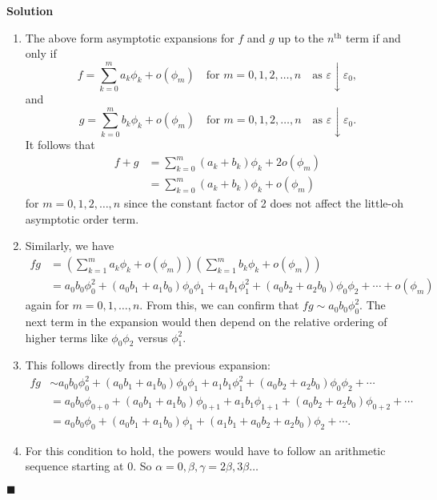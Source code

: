 \documentclass[11pt]{article}
\theoremstyle{problemstyle}
\newenvironment{solution}
  {\noindent\textbf{Solution}\quad}
  {\hfill$\blacksquare$\par\vspace{1em}}
\begin{document}
\begin{solution}
  \begin{enumerate}
    \item The above form asymptotic expansions for $f$ and $g$ up to the $n^\text{th}$ term if and
      only if
      \[
        f = \sum_{k=0}^{m} a_k \phi_k + o(\phi_m) \quad \text{for } m = 0, 1, 2, \dots, n \quad
        \text{as } \varepsilon \downarrow \varepsilon_0,
      \]
      and
      \[
        g = \sum_{k=0}^{m} b_k \phi_k + o(\phi_m) \quad \text{for } m = 0, 1, 2, \dots, n \quad
        \text{as } \varepsilon \downarrow \varepsilon_0.
      \]
      It follows that
      \begin{align*}
        f + g & = \sum_{k=0}^{m} (a_k + b_k) \phi_k + 2o(\phi_m) \\
              & = \sum_{k=0}^{m} (a_k + b_k) \phi_k + o(\phi_m)
      \end{align*}
      for $m = 0, 1, 2 ,\dots, n$ since the constant factor of 2 does not affect the little-oh
      asymptotic order term.
    \item Similarly, we have
      \begin{align*}
        fg & = \left( \sum_{k=1}^{m} a_k \phi_k + o(\phi_m) \right) \left( \sum_{k=1}^{m} b_k \phi_k
                + o(\phi_m) \right) \\
           & = a_0b_0\phi_0^2 + (a_0b_1 + a_1b_0)\phi_0\phi_1 + a_1b_1\phi_1^2 + (a_0b_2 +
                a_2b_0)\phi_0\phi_2 + \cdots + o(\phi_m)
      \end{align*}
      again for $m = 0, 1, \dots, n$. From this, we can confirm that $fg \sim a_0b_0\phi_0^2$. The
      next term in the expansion would then depend on the relative ordering of higher terms like
      $\phi_0\phi_2$ versus $\phi_1^2$.
    \item This follows directly from the previous expansion:
      \begin{align*}
        fg & \sim a_0b_0\phi_0^2 + (a_0b_1 + a_1b_0)\phi_0\phi_1 + a_1b_1\phi_1^2 + (a_0b_2 +
                a_2b_0)\phi_0\phi_2 + \cdots \\
           & = a_0b_0\phi_{0+0} + (a_0b_1 + a_1b_0)\phi_{0+1} + a_1b_1\phi_{1+1} + (a_0b_2 +
                a_2b_0)\phi_{0+2} + \cdots \\
           & = a_0b_0\phi_0 + (a_0b_1 + a_1b_0)\phi_1 + (a_1b_1 + a_0b_2 + a_2b_0)\phi_2 + \cdots.
      \end{align*}
    \item For this condition to hold, the powers would have to follow an arithmetic sequence
      starting at 0. So $\alpha = 0, \beta, \gamma = 2\beta, 3\beta \dots$
  \end{enumerate} 
\end{solution}
\end{document}
